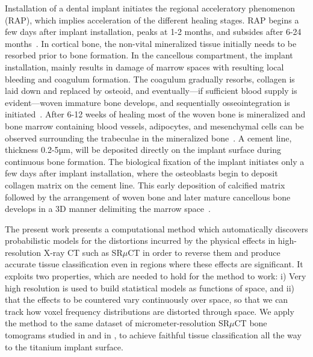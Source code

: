 Installation of a dental implant initiates the regional acceleratory phenomenon (RAP), which
implies acceleration of the different healing stages. RAP begins a few days after implant
installation, peaks at 1-2 months, and subsides after 6-24 months~\cite{frost1989}. In cortical bone,
the non-vital mineralized tissue initially needs to be resorbed prior to bone formation. In the
cancellous compartment, the implant installation, mainly results in damage of marrow spaces with
resulting local bleeding and coagulum formation. The coagulum gradually resorbs, collagen is laid
down and replaced by osteoid, and eventually—if sufficient blood supply is evident—woven immature
bone  develops, and sequentially osseointegration is initiated~\cite{frost1989}. After 6-12 weeks of
healing most of the woven bone is mineralized and bone marrow containing blood vessels, adipocytes,
and mesenchymal cells can be observed surrounding the trabeculae in the mineralized bone~\cite{Berglundh2003, Abrahamsson2004}.
A cement line, thickness  0.2-5µm, will be deposited
directly on the implant surface during continuous bone formation. The biological fixation of the
implant initiates only a few days after implant installation, where the osteoblasts begin to deposit
collagen matrix on the cement line. This early deposition of calcified matrix followed by the
arrangement of woven bone and later mature cancellous bone develops in a 3D manner delimiting the
marrow space~\cite{Franchi2004}.

The present work presents a computational method which automatically discovers probabilistic
models for the distortions incurred by the physical effects in high-resolution X-ray CT such
as SR$\mu$CT in order to reverse them and produce accurate tissue classification even in regions
where these effects are significant. It exploits two properties, which are needed to hold for
the method to work: i) Very high resolution is used to build statistical models as functions
of space, and ii) that the effects to be countered vary continuously over space, so that we can
track how voxel frequency distributions are distorted through space. We apply the method to the
same dataset of micrometer-resolution SR$\mu$CT bone tomograms studied in \cite{torsten2018}
and in \cite{sporring}, to achieve faithful tissue classification all the way to the titanium
implant surface.


